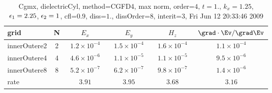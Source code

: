 \begin{table}[hbt]\tableFont %
\begin{center}
\begin{tabular}{|l|c|c|c|c|c|} \hline 
grid  & N &  $E_x$ &  $E_y$ & $H_z$ & $\grad\cdot\Ev/\grad\Ev$\\ \hline 
        innerOutere2 &     2 & ~$1.2\times10^{ -4}$~ & ~$1.5\times10^{ -4}$~ & ~$1.6\times10^{ -4}$~ & ~$1.1\times10^{ -4}$~  \\ \hline
        innerOutere4 &     4 & ~$4.6\times10^{ -6}$~ & ~$1.1\times10^{ -5}$~ & ~$1.1\times10^{ -5}$~ & ~$9.5\times10^{ -6}$~  \\ \hline
        innerOutere8 &     8 & ~$5.2\times10^{ -7}$~ & ~$6.2\times10^{ -7}$~ & ~$9.8\times10^{ -7}$~ & ~$1.4\times10^{ -6}$~  \\ \hline
    rate             &       &       $3.91$          &       $3.95$          &       $3.68$          &       $3.16$           \\ \hline
\end{tabular}
\caption{Cgmx, dielectricCyl, method=CGFD4, max norm, order=$4$, $t=1.$, $k_x=1.25$, $\epsilon_1=2.25$, $\epsilon_2=1$, cfl=$0.9$, diss=$1.$, dissOrder=$8$, interit=$3$, Fri Jun 12 20:33:46 2009}\label{table:dielectricCylNFDTDOrder4max}
\end{center}
\end{table}
